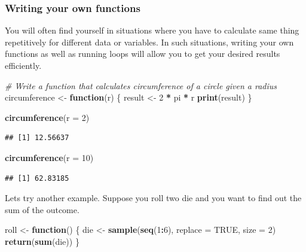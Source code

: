 \documentclass[
]{article}
\newenvironment{Shaded}{\begin{snugshade}}{\end{snugshade}}
\newcommand{\AttributeTok}[1]{\textcolor[rgb]{0.13,0.29,0.53}{#1}}
\newcommand{\CommentTok}[1]{\textcolor[rgb]{0.56,0.35,0.01}{\textit{#1}}}
\newcommand{\ConstantTok}[1]{\textcolor[rgb]{0.56,0.35,0.01}{#1}}
\newcommand{\ControlFlowTok}[1]{\textcolor[rgb]{0.13,0.29,0.53}{\textbf{#1}}}
\newcommand{\DecValTok}[1]{\textcolor[rgb]{0.00,0.00,0.81}{#1}}
\newcommand{\FunctionTok}[1]{\textcolor[rgb]{0.13,0.29,0.53}{\textbf{#1}}}
\newcommand{\NormalTok}[1]{#1}
\newcommand{\OtherTok}[1]{\textcolor[rgb]{0.56,0.35,0.01}{#1}}
\newcommand{\SpecialCharTok}[1]{\textcolor[rgb]{0.81,0.36,0.00}{\textbf{#1}}}
\begin{document}
\subsubsection{Writing your own
functions}\label{writing-your-own-functions}

You will often find yourself in situations where you have to calculate
same thing repetitively for different data or variables. In such
situations, writing your own functions as well as running loops will
allow you to get your desired results efficiently.

\begin{Shaded}
\begin{Highlighting}[]
\CommentTok{\# Write a function that calculates circumference of a circle given a radius}
\NormalTok{circumference }\OtherTok{\textless{}{-}} \ControlFlowTok{function}\NormalTok{(r) \{}
\NormalTok{  result }\OtherTok{\textless{}{-}} \DecValTok{2} \SpecialCharTok{*}\NormalTok{ pi }\SpecialCharTok{*}\NormalTok{ r}
  \FunctionTok{print}\NormalTok{(result)}
\NormalTok{\}}
\end{Highlighting}
\end{Shaded}

\begin{Shaded}
\begin{Highlighting}[]
\FunctionTok{circumference}\NormalTok{(}\AttributeTok{r =} \DecValTok{2}\NormalTok{)}
\end{Highlighting}
\end{Shaded}

\begin{verbatim}
## [1] 12.56637
\end{verbatim}

\begin{Shaded}
\begin{Highlighting}[]
\FunctionTok{circumference}\NormalTok{(}\AttributeTok{r =} \DecValTok{10}\NormalTok{)}
\end{Highlighting}
\end{Shaded}

\begin{verbatim}
## [1] 62.83185
\end{verbatim}

Lets try another example. Suppose you roll two die and you want to find
out the sum of the outcome.

\begin{Shaded}
\begin{Highlighting}[]
\NormalTok{roll }\OtherTok{\textless{}{-}} \ControlFlowTok{function}\NormalTok{() \{}
\NormalTok{  die }\OtherTok{\textless{}{-}} \FunctionTok{sample}\NormalTok{(}\FunctionTok{seq}\NormalTok{(}\DecValTok{1}\SpecialCharTok{:}\DecValTok{6}\NormalTok{), }\AttributeTok{replace =} \ConstantTok{TRUE}\NormalTok{, }\AttributeTok{size =} \DecValTok{2}\NormalTok{)}
  \FunctionTok{return}\NormalTok{(}\FunctionTok{sum}\NormalTok{(die))}
\NormalTok{\}}
\end{Highlighting}
\end{Shaded}
\end{document}
